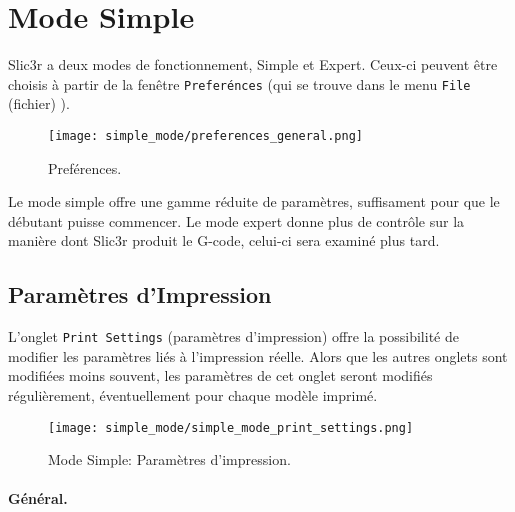 \section{Mode Simple} %
\label{sec:simple_mode}

Slic3r a deux modes de fonctionnement, Simple et Expert. Ceux-ci peuvent être choisis à partir de la fenêtre \texttt{Preferénces} (qui se trouve dans le menu  \texttt{File} (fichier) ).

\begin{figure}[ht]
\centering
\texttt{[image: simple\_mode/preferences\_general.png]}
\caption{Preférences.}
\label{fig:preferences_general}
\end{figure}

Le mode simple offre une gamme réduite de paramètres, suffisament pour que le débutant puisse commencer. Le mode expert donne plus de contrôle sur la manière dont Slic3r produit le G-code, celui-ci sera examiné plus tard.

\subsection{Paramètres d'Impression}

L'onglet \texttt{Print Settings} (paramètres d'impression) 
offre la possibilité de modifier les paramètres liés à l'impression réelle. Alors que les autres onglets sont modifiées moins souvent, les paramètres de cet onglet seront modifiés régulièrement, éventuellement pour chaque modèle imprimé.

\begin{figure}[ht]
\centering
\texttt{[image: simple\_mode/simple\_mode\_print\_settings.png]}
\caption{Mode Simple: Paramètres d'impression.}
\label{fig:simple_mode_print_settings}
\end{figure}

\paragraph{Général.} %
\label{par:simple_general}

